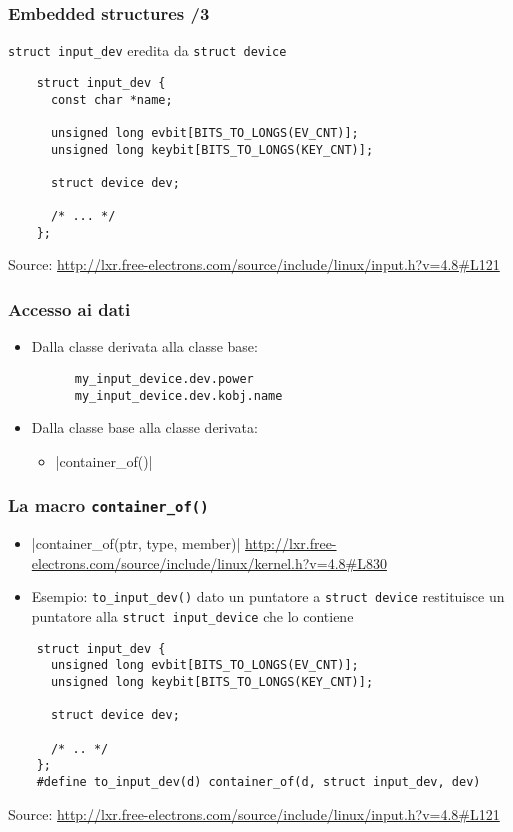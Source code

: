 \documentclass[xetex,table]{beamer}
\begin{document}
\begin{frame}[fragile]
  \frametitle{Embedded structures /3}
  \texttt{struct input\_dev} eredita da \texttt{struct device}

  \begin{verbatim}
    struct input_dev {
      const char *name;

      unsigned long evbit[BITS_TO_LONGS(EV_CNT)];
      unsigned long keybit[BITS_TO_LONGS(KEY_CNT)];

      struct device dev;

      /* ... */
    };
  \end{verbatim}
  {\tiny Source:
    \url{http://lxr.free-electrons.com/source/include/linux/input.h?v=4.8#L121}}
\end{frame}

\begin{frame}[fragile]
  \frametitle{Accesso ai dati}
  \begin{itemize}
  \item Dalla classe derivata alla classe base:
    \begin{verbatim}
      my_input_device.dev.power
      my_input_device.dev.kobj.name
    \end{verbatim}
  \item Dalla classe base alla classe derivata:
    \begin{itemize}
    \item {}|container_of()|
    \end{itemize}
  \end{itemize}
\end{frame}

\begin{frame}[fragile]
  \frametitle{La macro \texttt{container\_of()}}
    \begin{itemize}
    \item {}|container_of(ptr, type, member)|
      {\tiny\url{http://lxr.free-electrons.com/source/include/linux/kernel.h?v=4.8#L830}}
    \item Esempio: \texttt{to\_input\_dev()} dato un puntatore a
      \texttt{struct device} restituisce un puntatore alla
      \texttt{struct input\_device} che lo contiene
    \end{itemize}
  \begin{verbatim}
    struct input_dev {
      unsigned long evbit[BITS_TO_LONGS(EV_CNT)];
      unsigned long keybit[BITS_TO_LONGS(KEY_CNT)];

      struct device dev;

      /* .. */
    };
    #define to_input_dev(d) container_of(d, struct input_dev, dev)
  \end{verbatim}
  {\tiny Source:
    \url{http://lxr.free-electrons.com/source/include/linux/input.h?v=4.8#L121}}
\end{frame}
\end{document}
